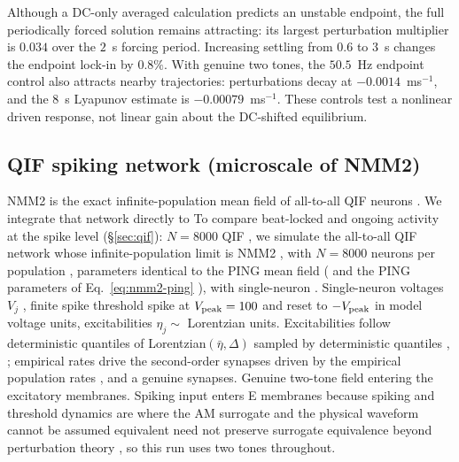 \documentclass[11pt,a4paper]{article}
\providecommand{\DIFaddtex}[1]{{\protect\color{blue} \sf #1}} %
\providecommand{\DIFdeltex}[1]{{\protect\color{red} \scriptsize #1}} %
\providecommand{\DIFaddbegin}{} %
\providecommand{\DIFaddend}{} %
\providecommand{\DIFdelbegin}{} %
\providecommand{\DIFdelend}{} %
\providecommand{\DIFadd}[1]{\texorpdfstring{\DIFaddtex{#1}}{#1}} %
\providecommand{\DIFdel}[1]{\texorpdfstring{\DIFdeltex{#1}}{}} %
\begin{document}
\DIFdelbegin \DIFdel{Although a DC-only averaged calculation predicts an unstable endpoint, the full
periodically forced solution remains attracting: its largest perturbation
multiplier is $0.034$ over the $2$~s forcing period. Increasing settling from
$0.6$ to $3$~s changes the endpoint lock-in by $0.8\%$. With genuine two tones,
the $50.5$~Hz endpoint control also attracts nearby trajectories: perturbations
decay at $-0.0014$~ms$^{-1}$, and the $8$~s Lyapunov estimate is
$-0.00079$~ms$^{-1}$.
These controls test a nonlinear driven response, not linear
gain about the DC-shifted equilibrium.
}\DIFdelend \subsection{QIF spiking network (microscale of NMM2)}\label{sec:qif-methods}
\DIFdelbegin \DIFdel{NMM2 is the exact infinite-population mean field of all-to-all QIF neurons
\cite{montbrio2015,ruffini2025rosetta,clusella2023}. We integrate that network directly
to }\DIFdelend \DIFaddbegin \DIFadd{To }\DIFaddend compare beat-locked and ongoing activity at the spike level\DIFdelbegin \DIFdel{(\S\ref{sec:qif}): $N=8000$ QIF }\DIFdelend \DIFaddbegin \DIFadd{, we simulate
the all-to-all QIF network whose infinite-population limit is
NMM2 \cite{montbrio2015,ruffini2025rosetta,clusella2023}, with $N=8000$
}\DIFaddend neurons per population \DIFdelbegin \DIFdel{, parameters identical to the PING mean field (}\DIFdelend \DIFaddbegin \DIFadd{and the PING parameters of }\DIFaddend Eq.~\eqref{eq:nmm2-ping}\DIFdelbegin \DIFdel{),
with single-neuron }\DIFdelend \DIFaddbegin \DIFadd{.
Single-neuron }\DIFaddend voltages $V_j$ \DIFdelbegin \DIFdel{, finite spike threshold }\DIFdelend \DIFaddbegin \DIFadd{spike at }\DIFaddend $V_{\rm peak}=100$ and reset \DIFaddbegin \DIFadd{to
}\DIFaddend $-V_{\rm peak}$ in model \DIFdelbegin \DIFdel{voltage units, excitabilities $\eta_j\sim$ Lorentzian}\DIFdelend \DIFaddbegin \DIFadd{units. Excitabilities follow deterministic
quantiles of Lorentzian}\DIFaddend $(\bar\eta,\Delta)$\DIFdelbegin \DIFdel{sampled by deterministic
quantiles , }\DIFdelend \DIFaddbegin \DIFadd{; empirical rates drive the
}\DIFaddend second-order \DIFdelbegin \DIFdel{synapses driven by the empirical population rates , and a genuine
}\DIFdelend \DIFaddbegin \DIFadd{synapses. Genuine }\DIFaddend two-tone \DIFdelbegin \DIFdel{field entering the
excitatory membranes. Spiking }\DIFdelend \DIFaddbegin \DIFadd{input enters E membranes because
spiking }\DIFaddend and threshold dynamics \DIFdelbegin \DIFdel{are
where the AM surrogate and the physical waveform cannot be assumed equivalent }\DIFdelend \DIFaddbegin \DIFadd{need not preserve surrogate equivalence
}\DIFaddend beyond perturbation theory\DIFdelbegin \DIFdel{, so this run uses two tones throughout}\DIFdelend .
\end{document}
